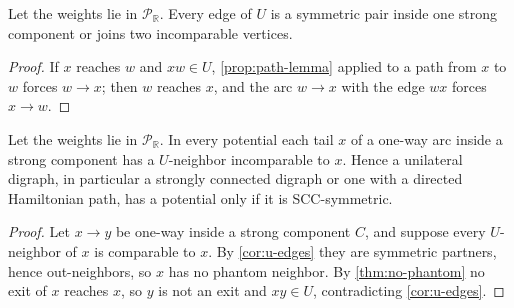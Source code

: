 \documentclass[final]{siamart0516}
\numberwithin{theorem}{section}
\numberwithin{equation}{section}
\theoremstyle{siamnonum}
\theoremstyle{plain}
\newcommand{\RR}{\mathbb{R}}
\newcommand{\Puis}{\mathcal{P}_{\RR}}
\begin{document}
\begin{corollary}\label{cor:u-edges}
Let the weights lie in $\Puis$. Every edge of $U$ is a symmetric pair inside one strong component or joins two incomparable vertices.
\end{corollary}
\begin{proof}
If $x$ reaches $w$ and $xw\in U$, \cref{prop:path-lemma} applied to a path from $x$ to $w$ forces $w\to x$; then $w$ reaches $x$, and the arc $w\to x$ with the edge $wx$ forces $x\to w$.
\end{proof}

\begin{corollary}\label{cor:unilateral}
Let the weights lie in $\Puis$. In every potential each tail $x$ of a one-way arc inside a strong component has a $U$-neighbor incomparable to $x$. Hence a unilateral digraph, in particular a strongly connected digraph or one with a directed Hamiltonian path, has a potential only if it is SCC-symmetric.
\end{corollary}
\begin{proof}
Let $x\to y$ be one-way inside a strong component $C$, and suppose every $U$-neighbor of $x$ is comparable to $x$. By \cref{cor:u-edges} they are symmetric partners, hence out-neighbors, so $x$ has no phantom neighbor. By \cref{thm:no-phantom} no exit of $x$ reaches $x$, so $y$ is not an exit and $xy\in U$, contradicting \cref{cor:u-edges}.
\end{proof}
\end{document}
